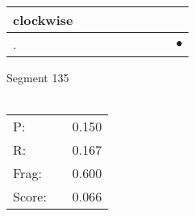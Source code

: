 \documentclass[landscape]{article}
\newcommand{\ssp}{\hspace{2pt}}
\newcommand{\mex}{\cellcolor{g}$\bullet$}
\begin{document}
\begin{tabular}{|l|p{10pt}|p{10pt}|p{10pt}|p{10pt}|p{10pt}|p{10pt}|p{10pt}|p{10pt}|}
\hline
\ssp clockwise \ssp&\hspace{2pt}&\hspace{2pt}&\hspace{2pt}&\hspace{2pt}&\hspace{2pt}&\hspace{2pt}&\hspace{2pt}&\hspace{2pt}\\
\hline
\ssp \cellcolor{ref7}. \ssp&\hspace{2pt}&\hspace{2pt}&\hspace{2pt}&\hspace{2pt}&\hspace{2pt}&\hspace{2pt}&\hspace{2pt}&\hspace{2pt}\mex\\
\hline
\end{tabular}

\vspace{6pt}
\noindent Segment 135\\\\
\noindent\begin{tabular}{lm{12pt}r}
\hline
P:&&0.150\\
R:&&0.167\\
Frag:&&0.600\\
Score:&&0.066\\
\end{tabular}

\newpage
\end{document}
